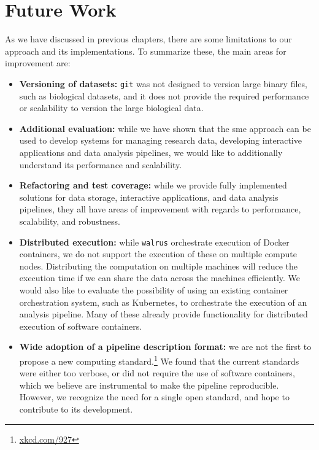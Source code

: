 
\section{Future Work}
As we have discussed in previous chapters, there are some limitations to our
approach and its implementations. To summarize these, the main areas for
improvement are: 

\begin{itemize} 

\item \textbf{Versioning of datasets:} \texttt{git} was not designed to version
large binary files, such as biological datasets, and it does not provide the
required performance or scalability to version the large biological data. 

\item \textbf{Additional evaluation:} while we have shown that the \gls{sme}
approach can be used to develop systems for managing research data, developing
interactive applications and data analysis pipelines, we would like to
additionally understand its performance and scalability. 

\item \textbf{Refactoring and test coverage:} while we provide fully implemented
solutions for data storage, interactive applications, and data analysis
pipelines, they all have areas of improvement with regards to performance,
scalability, and robustness. 

\item \textbf{Distributed execution:} while \texttt{walrus} orchestrate
execution of Docker containers, we do not support the execution of these on
multiple compute nodes. Distributing the computation on multiple machines will
reduce the execution time if we can share the data across the
machines efficiently. We would also like to evaluate the possibility of using an
existing container orchestration system, such as
Kubernetes, to orchestrate the execution of an analysis pipeline. Many of these
already provide functionality for distributed execution of software containers. 

\item \textbf{Wide adoption of a pipeline description format:} we are not the
first to propose a new computing standard.\footnote{\url{xkcd.com/927}} We found
that the current standards were either too verbose, or did not require the use
of software containers, which we believe are instrumental to make the pipeline
reproducible. However, we recognize the need for a single open standard, and
hope to contribute to its development. 

\end{itemize} 

